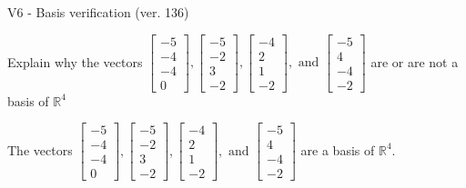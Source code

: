 \begin{exercise}
  \begin{exerciseTitle}V6 - Basis verification (ver. 136)\end{exerciseTitle}
  \begin{exerciseStatement}
    Explain why the vectors \(\left[\begin{array}{r}
-5 \\
-4 \\
-4 \\
0
\end{array}\right] , \left[\begin{array}{r}
-5 \\
-2 \\
3 \\
-2
\end{array}\right] , \left[\begin{array}{r}
-4 \\
2 \\
1 \\
-2
\end{array}\right] , \text{ and } \left[\begin{array}{r}
-5 \\
4 \\
-4 \\
-2
\end{array}\right]\) are or are not a basis of \(\mathbb{R}^4\)	


  \end{exerciseStatement}
  \begin{exerciseAnswer}
   The vectors \(\left[\begin{array}{r}
-5 \\
-4 \\
-4 \\
0
\end{array}\right] , \left[\begin{array}{r}
-5 \\
-2 \\
3 \\
-2
\end{array}\right] , \left[\begin{array}{r}
-4 \\
2 \\
1 \\
-2
\end{array}\right] , \text{ and } \left[\begin{array}{r}
-5 \\
4 \\
-4 \\
-2
\end{array}\right]\) 
  	 are  a basis of \(\mathbb{R}^4\).
  


  \end{exerciseAnswer}
\end{exercise}